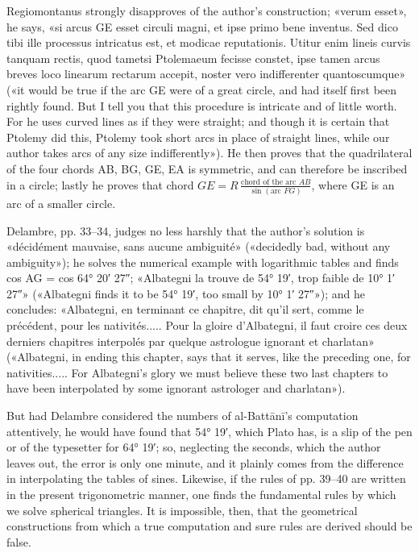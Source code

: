 \documentclass[11pt]{article}
\begin{document}
\par Regiomontanus strongly disapproves of the author's construction; «verum esset», he says, «si arcus GE esset circuli magni, et ipse primo bene inventus. Sed dico tibi ille processus intricatus est, et modicae reputationis. Utitur enim lineis curvis tanquam rectis, quod tametsi Ptolemaeum fecisse constet, ipse tamen arcus breves loco linearum rectarum accepit, noster vero indifferenter quantoscumque» («it would be true if the arc GE were of a great circle, and had itself first been rightly found. But I tell you that this procedure is intricate and of little worth. For he uses curved lines as if they were straight; and though it is certain that Ptolemy did this, Ptolemy took short arcs in place of straight lines, while our author takes arcs of any size indifferently»). He then proves that the quadrilateral of the four chords AB, BG, GE, EA is symmetric, and can therefore be inscribed in a circle; lastly he proves that chord $GE = R\,\frac{\text{chord of the arc } AB}{\sin(\text{arc } FG)}$, where GE is an arc of a smaller circle.\par
\par Delambre, pp. 33–34, judges no less harshly that the author's solution is «décidément mauvaise, sans aucune ambiguité» («decidedly bad, without any ambiguity»); he solves the numerical example with logarithmic tables and finds cos AG = cos 64° 20′ 27″; «Albategni la trouve de 54° 19′, trop faible de 10° 1′ 27″» («Albategni finds it to be 54° 19′, too small by 10° 1′ 27″»); and he concludes: «Albategni, en terminant ce chapitre, dit qu’il sert, comme le précédent, pour les nativités..... Pour la gloire d’Albategni, il faut croire ces deux derniers chapitres interpolés par quelque astrologue ignorant et charlatan» («Albategni, in ending this chapter, says that it serves, like the preceding one, for nativities..... For Albategni's glory we must believe these two last chapters to have been interpolated by some ignorant astrologer and charlatan»).\par
\par But had Delambre considered the numbers of al-Battānī's computation attentively, he would have found that 54° 19′, which Plato has, is a slip of the pen or of the typesetter for 64° 19′; so, neglecting the seconds, which the author leaves out, the error is only one minute, and it plainly comes from the difference in interpolating the tables of sines. Likewise, if the rules of pp. 39–40 are written in the present trigonometric manner, one finds the fundamental rules by which we solve spherical triangles. It is impossible, then, that the geometrical constructions from which a true computation and sure rules are derived should be false.\par
\end{document}
